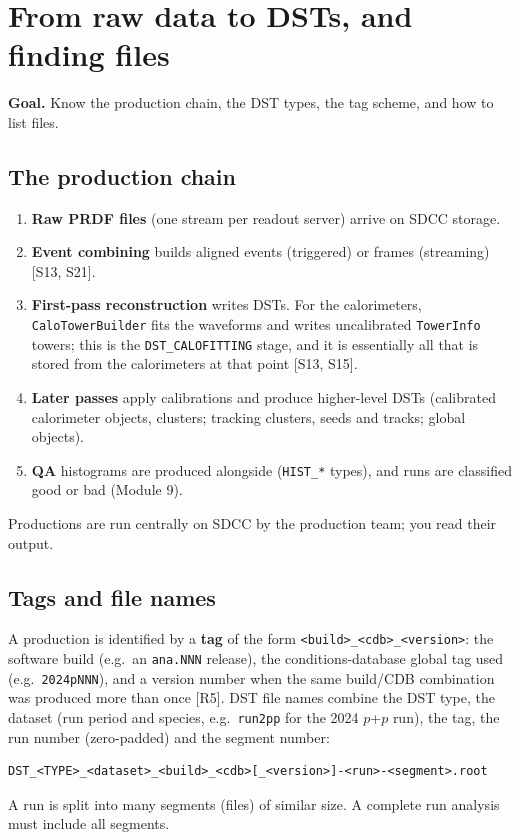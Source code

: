 \documentclass[11pt,letterpaper]{article}
\newcommand{\goal}[1]{\par\noindent\textbf{Goal.} #1\par\smallskip}
\newcommand{\code}[1]{\texttt{#1}}
\begin{document}
\section{From raw data to DSTs, and finding files}\label{sec:prod}
\goal{Know the production chain, the DST types, the tag scheme, and how to list files.}

\subsection{The production chain}
\begin{enumerate}
\item \textbf{Raw PRDF files} (one stream per readout server) arrive on SDCC storage.
\item \textbf{Event combining} builds aligned events (triggered) or frames (streaming) [S13, S21].
\item \textbf{First-pass reconstruction} writes DSTs. For the calorimeters, \code{CaloTowerBuilder} fits the waveforms and writes uncalibrated \code{TowerInfo} towers; this is the \code{DST\_CALOFITTING} stage, and it is essentially all that is stored from the calorimeters at that point [S13, S15].
\item \textbf{Later passes} apply calibrations and produce higher-level DSTs (calibrated calorimeter objects, clusters; tracking clusters, seeds and tracks; global objects).
\item \textbf{QA} histograms are produced alongside (\code{HIST\_*} types), and runs are classified good or bad (Module 9).
\end{enumerate}
Productions are run centrally on SDCC by the production team; you read their output.

\subsection{Tags and file names}
A production is identified by a \textbf{tag} of the form \code{<build>\_<cdb>\_<version>}: the software build (e.g.\ an \code{ana.NNN} release), the conditions-database global tag used (e.g.\ \code{2024pNNN}), and a version number when the same build/CDB combination was produced more than once [R5].
DST file names combine the DST type, the dataset (run period and species, e.g.\ \code{run2pp} for the 2024 $p$+$p$ run), the tag, the run number (zero-padded) and the segment number:
\begin{verbatim}
DST_<TYPE>_<dataset>_<build>_<cdb>[_<version>]-<run>-<segment>.root
\end{verbatim}
A run is split into many segments (files) of similar size. A complete run analysis must include all segments.
\end{document}
